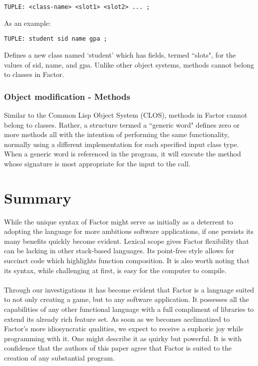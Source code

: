 \documentclass{sig-alternate}
\begin{document}
\begin{verbatim}
TUPLE: <class-name> <slot1> <slot2> ... ;
\end{verbatim}
As an example:

\begin{verbatim}
TUPLE: student sid name gpa ;
\end{verbatim}

Defines a new class named `student' which has fields, termed ``slots", for the values of sid, name, and gpa. Unlike other object systems, methods cannot belong to classes in Factor. 
 
\subsubsection{Object modification - Methods}
Similar to the Common Lisp Object System (CLOS), methods in Factor cannot belong to classes. Rather, a structure termed a ``generic word" defines zero or more methods all with the intention of performing the same functionality, normally using a different implementation for each specified input class type. When a generic word is referenced in the program, it will execute the method whose signature is most appropriate for the input to the call.

\section{Summary} 
While the unique syntax of Factor might serve as initially as a deterrent to adopting the language for more ambitious software applications, if one persists its many benefits quickly become evident. Lexical scope gives Factor flexibility that can be lacking in other stack-based languages. Its point-free style allows for succinct code which highlights function composition. It is also worth noting that its syntax, while challenging at first, is easy for the computer to compile.
\\\\
Through our investigations it has become evident that Factor is a language suited to not only creating a game, but to any software application. It possesses all the capabilities of any other functional language with a full compliment of libraries to extend its already rich feature set. As soon as we becomes acclimatized to Factor's more idiosyncratic qualities, we expect to receive a euphoric joy while programming with it. One might describe it as quirky but powerful. It is with confidence that the authors of this paper agree that Factor is suited to the creation of any substantial program.
\\\\
\theendnotes

\balancecolumns
\end{document}
